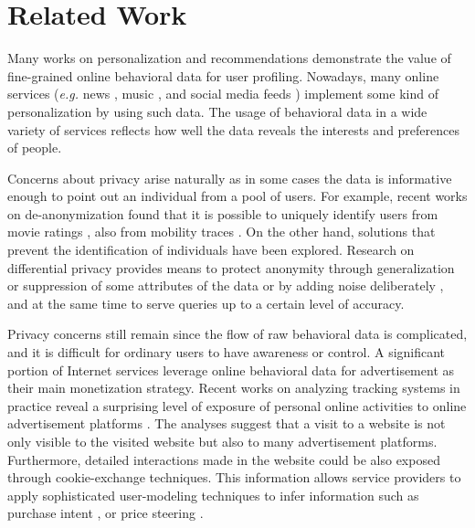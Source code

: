 \section{Related Work}
Many works on personalization and recommendations demonstrate the value of fine-grained online behavioral data for user profiling. Nowadays, many online services (\textit{e.g.} news \cite{liu2010personalized}, music \cite{koenigstein2011yahoo}, and social media feeds \cite{chen2010short}) implement some kind of personalization by using such data. The usage of behavioral data in a wide variety of services reflects how well the data reveals the interests and preferences of people.

Concerns about privacy arise naturally as in some cases the data is informative enough to point out an individual from a pool of users. For example, recent works on de-anonymization found that it is possible to uniquely identify users from movie ratings \cite{narayanan2008robust}, also from mobility traces \cite{de2013unique}. On the other hand, solutions that prevent the identification of individuals have been explored. Research on differential privacy \cite{dwork2008differential} provides means to protect anonymity through generalization or suppression of some attributes of the data \cite{samarati1998protecting} or by adding noise deliberately \cite{iyengar2002transforming}, and at the same time to serve queries up to a certain level of accuracy.

Privacy concerns still remain since the flow of raw behavioral data is complicated, and it is difficult for ordinary users to have awareness or control. A significant portion of Internet services leverage online behavioral data for advertisement as their main monetization strategy. Recent works on analyzing tracking systems in practice reveal a surprising level of exposure of personal online activities to online advertisement platforms \cite{carrascosa2015always}\cite{castelluccia2014selling}. The analyses suggest that a visit to a website is not only visible to the visited website but also to many advertisement platforms. Furthermore, detailed interactions made in the website could be also exposed through cookie-exchange techniques. This information allows service providers to apply sophisticated user-modeling techniques to infer information such as purchase intent \cite{carrascosa2015always}, or price steering \cite{hannak2014measuring}.

